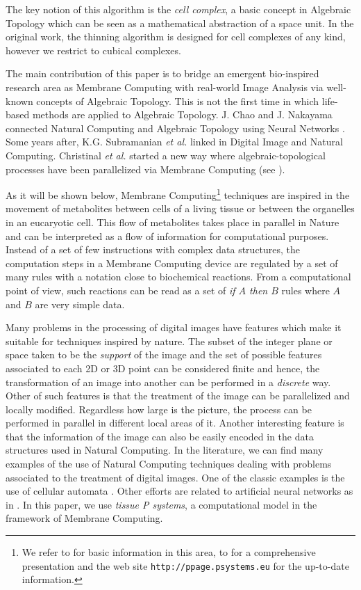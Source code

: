 \documentclass[journal]{IEEEtran}
\begin{document}
The key notion of this algorithm is the {\it cell complex}, a basic
concept in Algebraic Topology which can be seen as a mathematical
abstraction of a space unit. In the original work, the thinning algorithm is designed for cell complexes of any kind, however we
restrict to cubical complexes. 

The main contribution of this paper is
to bridge an emergent bio-inspired research area as Membrane
Computing with real-world Image Analysis via well-known concepts of
Algebraic Topology. This is not the first time in which life-based
methods are applied to Algebraic Topology. J. Chao and J.
Nakayama connected Natural Computing and Algebraic Topology using
Neural Networks \cite{10.1109/ICPR.1996.547259}. Some years after, K.G. Subramanian {\it et al.} linked in
\cite{DBLP:journals/nc/CeterchiMPS03} Digital Image and Natural
Computing. Christinal {\it et al.} started a new way where
algebraic-topological processes have been parallelized via Membrane
Computing (see
\cite{DBLP:conf/iwcia/ChristinalDJ09,ChristinalDR10,DiazPernilCGR2012,Diaz-PernilGRS10}).

As it will be shown below, Membrane Computing\footnote{We refer to
\cite{paunbook} for basic information in this area, to
\cite{HandbookMC10} for a comprehensive presentation and the web
site {\tt http://ppage.psystems.eu} for the up-to-date information.}
techniques are inspired in the movement of metabolites between cells of
a living tissue or between the organelles in an eucaryotic cell.
This flow of metabolites takes place in parallel in Nature and can
be interpreted as a flow of information for computational purposes.
Instead of a set of few instructions with complex data structures,
the computation steps in a Membrane Computing device are regulated
by a set of many rules with a notation close to biochemical reactions.
From a computational point of view, such reactions can be read as a
set of {\it if $A$ then $B$} rules where $A$ and $B$ are very simple
data.

Many problems in the processing of digital images have features
which make it suitable for techniques inspired by nature. The subset
of the integer plane or space taken to be the {\it support} of the
image and the set of possible features associated to each 2D or 3D
point can be considered finite and hence, the transformation of an
image into another can be performed in a \emph{discrete} way. Other
of such features is that the treatment of the image can be
parallelized and locally modified. Regardless how large is the
picture, the process can be performed in parallel in different local
areas of it. Another interesting feature is that the information of
the image can also be easily encoded in the data structures used in
Natural Computing. In the literature, we can find many examples of
the use of Natural Computing techniques dealing with problems
associated to the treatment of digital images. One of the classic
examples is the use of cellular automata
\cite{DBLP:journals/tip/Rosin06}. Other efforts are related to
artificial neural networks as in
\cite{DBLP:journals/pr/Egmont-PetersenRH02}. In this paper, we use
{\it tissue P systems}, a computational model in the framework of
Membrane Computing.
\end{document}
